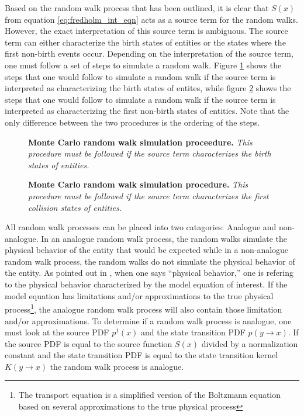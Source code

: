Based on the random walk process that has been outlined, it is clear that 
$S(x)$ from equation \ref{eq:fredholm_int_eqn} acts as a source term for
the random walks. However, the exact interpretation of this source term is 
ambiguous. The source term can either characterize the birth states of entities
or the states where the first non-birth events occur. Depending on the 
interpretation of the source term, one must follow a set of steps to simulate a
random walk. Figure \ref{fig:random_walk_process_1} shows the steps that one 
would follow to simulate a random walk if the source term is interpreted as 
characterizing the birth states of entites, while figure 
\ref{fig:random_walk_process_2} shows the steps that one would follow to 
simulate a random walk if the source term is interpreted as characterizing the 
first non-birth states of entities. Note that the only difference between the 
two procedures is the ordering of the steps.
\begin{figure}[t!]
  \begin{center}
  \end{center}
  \caption{\textbf{Monte Carlo random walk simulation proceedure.} \textit{This
      procedure must be followed if the source term characterizes the birth
      states of entities.} }
  \label{fig:random_walk_process_1}
\end{figure}
\begin{figure}[t!]
  \begin{center}
  \end{center}
  \caption{\textbf{Monte Carlo random walk simulation procedure.} \textit{This
      procedure must be followed if the source term characterizes the first
      collision states of entities.} }
  \label{fig:random_walk_process_2}
\end{figure}

All random walk processes can be placed into two catagories: Analogue and 
non-analogue. In an analogue random walk process, the random walks simulate
the physical behavior of the entity that would be expected while in a 
non-analogue random walk process, the random walks do not simulate the physical
behavior of the entity. As pointed out in \citep{ref}, when one says ``physical
behavior,'' one is refering to the physical behavior characterized by the
model equation of interest. If the model equation has limitations and/or
approximations to the true physical process\footnote{The transport equation is
a simplified version of the Boltzmann equation based on several approximations
to the true physical process}, the analogue random walk process will also 
contain those limitation and/or approximations. To determine if a random walk
process is analogue, one must look at the source PDF $p^1(x)$ and the state 
transition PDF $p(y \to x)$. If the source PDF is equal to the source function
$S(x)$ divided by a normalization constant and the state transition PDF is 
equal to the state transition kernel $K(y \to x)$ the random walk process is 
analogue. 

